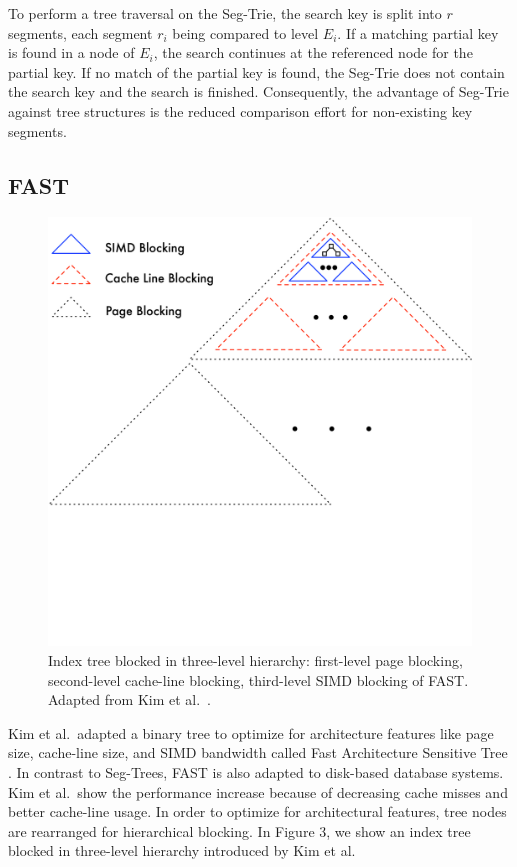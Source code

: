 \documentclass[runningheads,a4paper]{llncs}
\begin{document}
To perform a tree traversal on the Seg-Trie, the search key is split into $r$ segments, each segment $r_i$ being compared to level $E_i$. If a matching partial key is found in a node of $E_i$, the search continues at the referenced node for the partial key. If no match of the partial key is found, the Seg-Trie does not contain the search key and the search is finished. Consequently, the advantage of Seg-Trie against tree structures is the reduced comparison effort for non-existing key segments. 


\subsection{FAST}\label{SCM}
\begin{figure} \vspace{-35pt}
  \begin{center}
	\includegraphics[width=.51\textwidth]{FAST}\vspace{-40pt}
	\caption{Index tree blocked in three-level hierarchy: first-level page blocking, second-level cache-line blocking, third-level SIMD blocking of FAST. Adapted from Kim et al.\ \cite{kim2010fast}.}
	\label{fast}  
	\end{center}\vspace{-20pt}
\end{figure}Kim et al.\ adapted a binary tree to optimize for architecture features like page size, cache-line size, and SIMD bandwidth called Fast Architecture Sensitive Tree \cite{kim2010fast}. In contrast to Seg-Trees, FAST is also adapted to disk-based database systems. Kim et al.\ show the performance increase because of decreasing cache misses and better cache-line usage. In order to optimize for architectural features, tree nodes are rearranged for hierarchical blocking. In Figure 3, we show an index tree blocked in three-level hierarchy introduced by Kim et al.\ 
\end{document}
